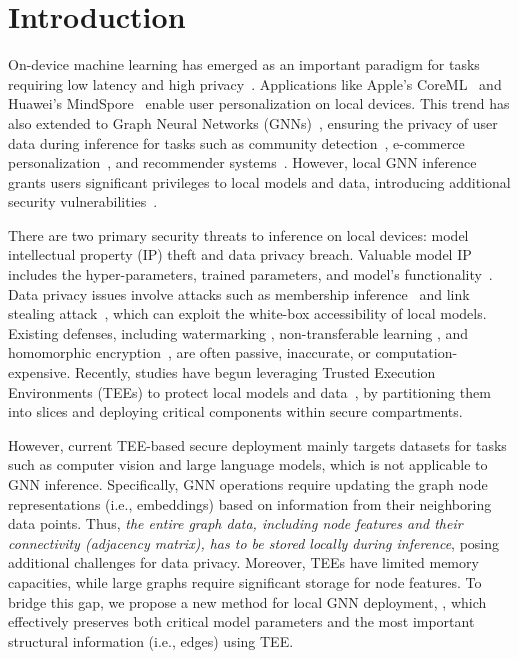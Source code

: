 \section{Introduction} \label{sec: introduction}

On-device machine learning has emerged as an important paradigm for tasks requiring low latency and high privacy~\cite{dhar2021survey}. 
Applications like Apple's CoreML~\cite{coreml} and Huawei's MindSpore~\cite{mindspore} enable user personalization on local devices. 
This trend has also extended to Graph Neural Networks (GNNs)~\cite{zeng2022gnn, shao2021branchy}, ensuring the privacy of user data during inference for tasks such as community detection~\cite{shchur2019overlapping}, e-commerce personalization~\cite{zhu2019aligraph}, and recommender systems~\cite{wu2022graph}. 
However, local GNN inference grants users significant privileges to local models and data, introducing additional security vulnerabilities~\cite{xue2021dnn}.

There are two primary security threats to inference on local devices: model intellectual property (IP) theft and data privacy breach. 
Valuable model IP includes the hyper-parameters, trained parameters, and model's functionality~\cite{gongye2024side}. 
Data privacy issues involve attacks such as membership inference~\cite{shokri2017membership} and link stealing attack~\cite{he2021stealing}, which can exploit the white-box accessibility of local models.
Existing defenses, including  watermarking \cite{guo2018watermarking}, non-transferable learning \cite{wang2021non}, and homomorphic encryption~\cite{xie2019bayhenn}, are often passive, inaccurate, or computation-expensive. 
Recently, studies have begun leveraging Trusted Execution Environments (TEEs) to protect local models and data~\cite{zhang2024no, liu2023mirrornet}, by partitioning them into slices and deploying critical components within secure compartments.


However, current TEE-based secure deployment mainly targets datasets for tasks such as computer vision and large language models, which is not applicable to GNN inference. 
Specifically, GNN operations require updating the graph node representations (i.e., embeddings) based on information from their neighboring data points. 
Thus, \textit{the entire graph data, including node features and their connectivity (adjacency matrix), has to be stored locally during inference}, posing additional challenges for data privacy. 
Moreover, TEEs have limited memory capacities, while large graphs require significant storage for node features. 
To bridge this gap, we propose a new method for local GNN deployment, \mymethod, which effectively preserves both critical model parameters and the most important structural information (i.e., edges) using TEE.

